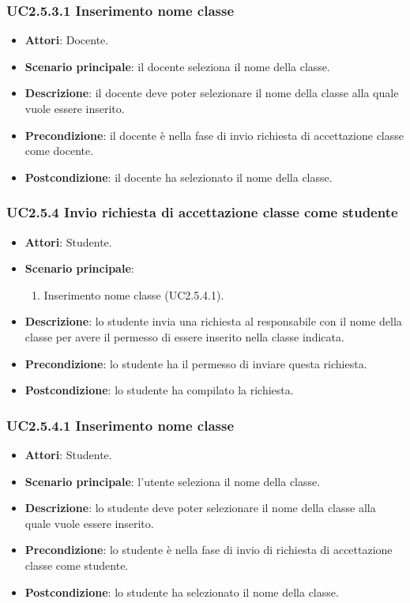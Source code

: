 \subsubsection{UC2.5.3.1 Inserimento nome classe}
\begin{itemize}
\item \textbf{Attori}: Docente.
\item \textbf{Scenario principale}: il docente seleziona il nome della classe.
\item \textbf{Descrizione}: il docente deve poter selezionare il nome della classe alla quale vuole essere inserito.
\item \textbf{Precondizione}: il docente è nella fase di invio richiesta di accettazione classe come docente.
\item \textbf{Postcondizione}: il docente ha selezionato il nome della classe.
\end{itemize}
\subsubsection{UC2.5.4 Invio richiesta di accettazione classe come studente}
\begin{itemize}
\item \textbf{Attori}: Studente.
\item \textbf{Scenario principale}:
\begin{enumerate}
\item Inserimento nome classe (UC2.5.4.1).
\end{enumerate}
\item \textbf{Descrizione}: lo studente invia una richiesta al responsabile con il nome della classe per avere il permesso di essere inserito nella classe indicata.
\item \textbf{Precondizione}: lo studente ha il permesso di inviare questa richiesta.
\item \textbf{Postcondizione}: lo studente ha compilato la richiesta.
\end{itemize}
\subsubsection{UC2.5.4.1 Inserimento nome classe}
\begin{itemize}
\item \textbf{Attori}: Studente.
\item \textbf{Scenario principale}: l'utente seleziona il nome della classe.
\item \textbf{Descrizione}: lo studente deve poter selezionare il nome della classe alla quale vuole essere inserito.
\item \textbf{Precondizione}: lo studente è nella fase di invio di richiesta di accettazione classe come studente.
\item \textbf{Postcondizione}: lo studente ha selezionato il nome della classe.
\end{itemize}
